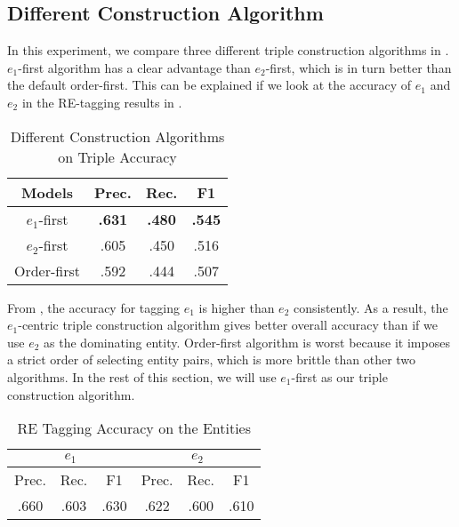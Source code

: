 \subsection{Different Construction Algorithm}
In this experiment, we compare three different triple construction algorithms
in . $e_1$-first algorithm has a clear advantage
than $e_2$-first, which is in turn better than the default order-first.
This can be explained if we look at the accuracy of $e_1$ and $e_2$ in
the RE-tagging results in .
\begin{table}[th!]
  \small
  \begin{center}
  \caption{Different Construction Algorithms on Triple Accuracy}
  \label{tab:cons1}
    \begin{tabular}{c|ccc}
      \hline
      \bf Models & \bf Prec. & \bf Rec. & \bf F1 \\
      \hline
      $e_1$-first   &  \textbf{.631} & \textbf{.480} & \textbf{.545}  \\
      $e_2$-first   &  .605 & .450 & .516  \\
      Order-first  &  .592 & .444 & .507  \\
      \hline
    \end{tabular}
  \end{center}
\end{table}

From , the accuracy for tagging $e_1$ is higher than
$e_2$ consistently.  As a result, the $e_1$-centric 
triple construction algorithm gives better overall accuracy than if we
use $e_2$ as the dominating entity. Order-first algorithm is worst because
it imposes a strict order of selecting entity pairs, which is more brittle
than other two algorithms. In the rest of this section, we will
use $e_1$-first as our triple construction algorithm.

\begin{table}[th!]
  \small
  \begin{center}
  \caption{RE Tagging Accuracy on the Entities}
  \label{tab:cons2}
    \begin{tabular}{ccc|ccc}
      \hline
       \multicolumn{3}{c|}{$e_1$} & \multicolumn{3}{c}{$e_2$} \\
      \hline
      	 Prec. & Rec. & F1 & Prec. & Rec. & F1 \\
      \hline
        .660 & .603 & .630 & .622 & .600 & .610 \\
      \hline
    \end{tabular}
  \end{center}
\end{table}



